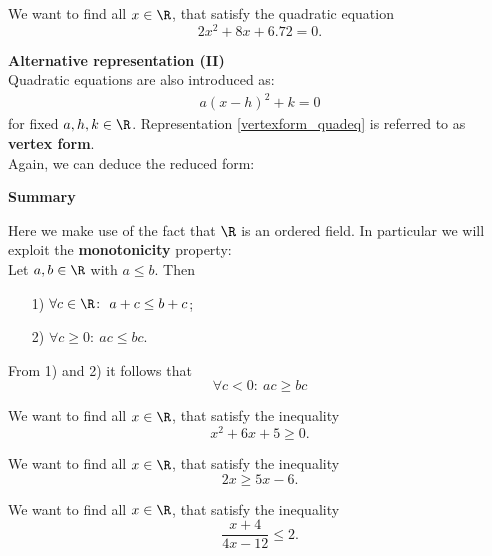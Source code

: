 {\begin{frame}
 \end{frame}

\begin{frame} 
\begin{ex}
	We want to find all $x \in \R$, that satisfy the quadratic equation $$2x^2 + 8x + 6.72 = 0 .$$
\end{ex}
 \end{frame}


\begin{frame} 
\textbf{Alternative representation (II)}\\[6pt]
Quadratic equations are also introduced as:
\begin{align} \label{vertexform_quadeq}
a(x-h)^2 + k = 0 
\end{align}
for fixed $a,h,k \in \R$. Representation \eqref{vertexform_quadeq} is referred to as {\color{defgruen} \textbf{vertex form}}.\\[5pt]
Again, we can deduce the reduced form:
 \end{frame}





\begin{frame} 
\textbf{Summary}
 \end{frame}

\begin{frame} 
Here we make use of the fact that $\R$ is an ordered field. In particular we will exploit the \textbf{monotonicity} property:\\[6pt]
Let $a,b\in \R$ with $a\leq b$. Then
\vspace{-0.24cm}
\begin{itemize}
	\item[1)] $\forall c\in \R\colon ~ a+c\leq b+c$;
	\item[2)] $\forall c\geq 0\colon ~ ac\leq bc$.
\end{itemize}
From 1) and 2) it follows that
$$\forall c< 0\colon ~ ac\geq bc $$
 \end{frame}


\begin{frame} 
\begin{ex}
	We want to find all $x \in \R$, that satisfy the inequality $$x^2 + 6x + 5 \geq 0 .$$
\end{ex}
 \end{frame}



\begin{frame} 
\begin{ex}
	We want to find all $x \in \R$, that satisfy the inequality $$2x \geq 5x-6.$$
\end{ex}
 \end{frame}


\begin{frame} 
\begin{ex}
	We want to find all $x \in \R$, that satisfy the inequality $$\frac{x+4}{4x-12}  \leq 2.$$
\end{ex}
 \end{frame}

}
